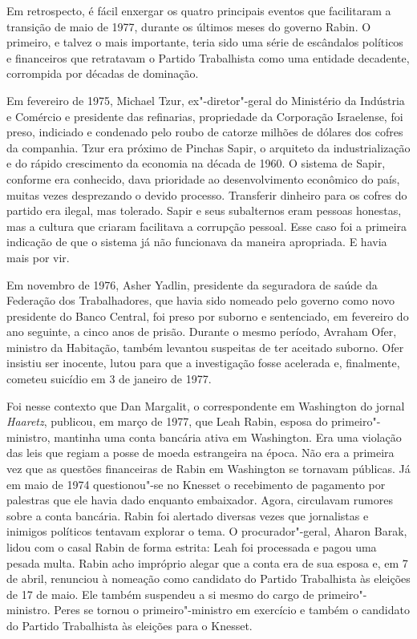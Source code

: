 Em retrospecto, é fácil enxergar os quatro principais eventos que
facilitaram a transição de maio de 1977, durante os últimos meses do
governo Rabin. O primeiro, e talvez o mais importante, teria sido uma
série de escândalos políticos e financeiros que retratavam o Partido
Trabalhista como uma entidade decadente, corrompida por décadas de
dominação.

Em fevereiro de 1975, Michael Tzur, ex"-diretor"-geral do Ministério da
Indústria e Comércio e presidente das refinarias, propriedade da
Corporação Israelense, foi preso, indiciado e condenado pelo roubo de
catorze milhões de dólares dos cofres da companhia. Tzur era próximo de
Pinchas Sapir, o arquiteto da industrialização e do rápido crescimento
da economia na década de 1960. O sistema de Sapir, conforme era
conhecido, dava prioridade ao desenvolvimento econômico do país, muitas
vezes desprezando o devido processo. Transferir dinheiro para os cofres
do partido era ilegal, mas tolerado. Sapir e seus subalternos eram
pessoas honestas, mas a cultura que criaram facilitava a corrupção
pessoal. Esse caso foi a primeira indicação de que o sistema já não
funcionava da maneira apropriada. E havia mais por vir.

Em novembro de 1976, Asher Yadlin, presidente da seguradora de saúde da
Federação dos Trabalhadores, que havia sido nomeado pelo governo como
novo presidente do Banco Central, foi preso por suborno e sentenciado,
em fevereiro do ano seguinte, a cinco anos de prisão. Durante o
mesmo período, Avraham Ofer, ministro da Habitação, também levantou
suspeitas de ter aceitado suborno. Ofer insistiu ser inocente, lutou
para que a investigação fosse acelerada e, finalmente, cometeu suicídio
em 3 de janeiro de 1977.

Foi nesse contexto que Dan Margalit, o correspondente em Washington do
jornal \emph{Haaretz}, publicou, em março de 1977, que
Leah Rabin, esposa do primeiro"-ministro, mantinha uma conta bancária
ativa em Washington. Era uma violação das leis que regiam a posse de
moeda estrangeira na época. Não era a primeira vez que as questões
financeiras de Rabin em Washington se tornavam públicas. Já em maio de
1974 questionou"-se no Knesset o recebimento de pagamento por palestras
que ele havia dado enquanto embaixador. Agora, circulavam rumores sobre
a conta bancária. Rabin foi alertado diversas vezes que jornalistas e
inimigos políticos tentavam explorar o tema. O procurador"-geral, Aharon
Barak, lidou com o casal Rabin de forma estrita: Leah foi processada e
pagou uma pesada multa. Rabin acho impróprio alegar que a conta era de
sua esposa e, em 7 de abril, renunciou à nomeação como candidato do
Partido Trabalhista às eleições de 17 de maio. Ele também 
suspendeu a si mesmo do cargo de primeiro"-ministro. Peres se tornou o
primeiro"-ministro em exercício e também o candidato do Partido Trabalhista às eleições
para o Knesset.

